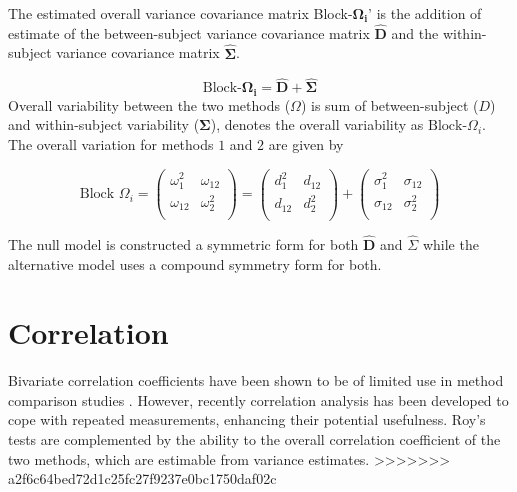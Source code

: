 \documentclass[12pt, a4paper]{report}
\theoremstyle{plain}
\theoremstyle{definition}
\theoremstyle{remark}
\begin{document}
The estimated overall variance covariance matrix Block-$\boldsymbol{\Omega_{i}}$' is the addition of estimate of the between-subject variance covariance matrix ${\hat{\boldsymbol{D}}}$ and the within-subject variance covariance matrix $\boldsymbol{\hat{\Sigma}}$.

\begin{equation}
\mbox{Block-}\boldsymbol{\Omega_{i}} = \boldsymbol{\hat{D}} + \boldsymbol{\hat{\Sigma}}
\end{equation}
Overall variability between the two methods ($\Omega$) is sum of between-subject ($D$) and within-subject variability ($\boldsymbol{\Sigma}$),
\citet{ARoy2009} denotes the overall variability as ${\mbox{Block-} \Omega_{i}}$. The overall variation for methods $1$ and $2$ are given by

\begin{equation}\mbox{Block } {\Omega}_i = \left(\begin{array}{cc}
\omega^2_1  & \omega_{12} \\
\omega_{12} & \omega^2_2 \\
\end{array}  \right)
=  \left(
\begin{array}{cc}
d^2_1  & d_{12} \\
d_{12} & d^2_2 \\
\end{array} \right)+
\left(
\begin{array}{cc}
\sigma^2_1  & \sigma_{12} \\
\sigma_{12} & \sigma^2_2 \\
\end{array}\right)
\end{equation}


The null model is constructed a symmetric form for both $\boldsymbol{\hat{D}}$ and ${\hat{\Sigma}}$ while the alternative model uses a compound symmetry form for both.


\section{Correlation}
Bivariate correlation coefficients have been shown to be of limited use in method comparison studies \citep{BA86}. However,
recently correlation analysis has been developed to cope with repeated measurements, enhancing their potential usefulness.
Roy's tests are complemented by the ability to the overall correlation coefficient of the two methods, which are estimable from variance estimates.
>>>>>>> a2f6c64bed72d1c25fc27f9237e0bc1750daf02c
\end{document}
